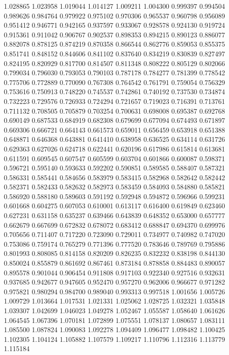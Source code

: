 1.028865
1.023958
1.019044
1.014127
1.009211
1.004300
0.999397
0.994504
0.989626
0.984764
0.979922
0.975102
0.970306
0.965537
0.960798
0.956089
0.951412
0.946771
0.942165
0.937597
0.933067
0.928578
0.924130
0.919724
0.915361
0.911042
0.906767
0.902537
0.898353
0.894215
0.890123
0.886077
0.882078
0.878125
0.874219
0.870358
0.866544
0.862776
0.859053
0.855375
0.851741
0.848152
0.844606
0.841102
0.837640
0.834219
0.830839
0.827497
0.824195
0.820929
0.817700
0.814507
0.811348
0.808222
0.805129
0.802066
0.799034
0.796030
0.793053
0.790103
0.787178
0.784277
0.781399
0.778542
0.775706
0.772889
0.770090
0.767308
0.764542
0.761791
0.759054
0.756329
0.753616
0.750913
0.748220
0.745537
0.742861
0.740192
0.737530
0.734874
0.732223
0.729576
0.726933
0.724294
0.721657
0.719023
0.716391
0.713761
0.711132
0.708505
0.705879
0.703254
0.700631
0.698008
0.695387
0.692768
0.690149
0.687533
0.684919
0.682308
0.679699
0.677094
0.674493
0.671897
0.669306
0.666721
0.664143
0.661573
0.659011
0.656459
0.653918
0.651388
0.648871
0.646368
0.643881
0.641410
0.638958
0.636525
0.634114
0.631726
0.629363
0.627026
0.624718
0.622441
0.620196
0.617986
0.615814
0.613681
0.611591
0.609545
0.607547
0.605599
0.603704
0.601866
0.600087
0.598371
0.596721
0.595140
0.593633
0.592202
0.590851
0.589585
0.588407
0.587321
0.586331
0.585441
0.584656
0.583979
0.583415
0.582968
0.582642
0.582442
0.582371
0.582433
0.582632
0.582973
0.583459
0.584093
0.584880
0.585821
0.586920
0.588180
0.589603
0.591192
0.592948
0.594872
0.596966
0.599231
0.601668
0.604275
0.607053
0.610001
0.613117
0.616400
0.619849
0.623460
0.627231
0.631158
0.635237
0.639466
0.643839
0.648352
0.653000
0.657777
0.662679
0.667699
0.672832
0.678072
0.683412
0.688847
0.694370
0.699976
0.705656
0.711407
0.717220
0.723090
0.729011
0.734977
0.740982
0.747020
0.753086
0.759174
0.765279
0.771396
0.777520
0.783646
0.789769
0.795886
0.801993
0.808085
0.814158
0.820209
0.826235
0.832232
0.838198
0.844130
0.850024
0.855879
0.861692
0.867461
0.873184
0.878858
0.884483
0.890057
0.895578
0.901044
0.906454
0.911808
0.917103
0.922340
0.927516
0.932631
0.937685
0.942677
0.947605
0.952470
0.957270
0.962006
0.966677
0.971282
0.975821
0.980294
0.984700
0.989040
0.993313
0.997518
1.001656
1.005726
1.009729
1.013664
1.017531
1.021331
1.025062
1.028725
1.032321
1.035848
1.039307
1.042699
1.046023
1.049278
1.052467
1.055587
1.058640
1.061626
1.064545
1.067396
1.070181
1.072899
1.075551
1.078137
1.080657
1.083111
1.085500
1.087824
1.090083
1.092278
1.094409
1.096477
1.098482
1.100425
1.102305
1.104124
1.105882
1.107579
1.109217
1.110796
1.112316
1.113779
1.115184

